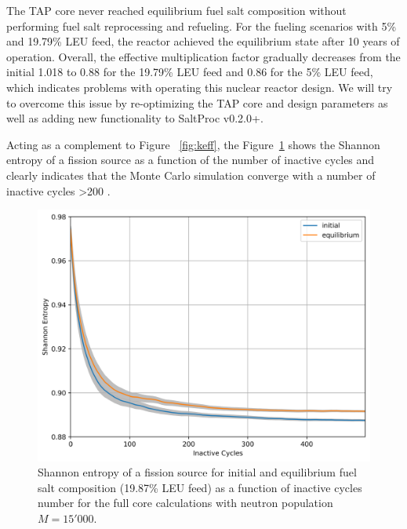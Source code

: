 \documentclass[12pt]{article} %
\begin{document}
The \gls{TAP} core never reached equilibrium fuel salt composition without 
performing fuel salt reprocessing and refueling. For the fueling scenarios 
with 5\% and 19.79\% \gls{LEU} feed, the reactor achieved the equilibrium 
state after 10 years of operation. Overall, the effective multiplication 
factor gradually decreases from the initial 1.018 to 0.88 for the 19.79\% 
\gls{LEU} feed and 0.86 for the 5\% \gls{LEU} feed, which indicates 
problems with operating this nuclear reactor design. We will try to overcome 
this issue by re-optimizing the \gls{TAP} core and design parameters as well 
as adding new functionality to SaltProc v0.2.0+.

Acting as a complement to Figure ~\ref{fig:keff}, the Figure~\ref{fig:shannon} 
shows the Shannon entropy of a fission source as a function of the number of 
inactive cycles and clearly indicates that the Monte Carlo simulation 
converge with a number of inactive cycles >200 
\cite{brown_k-effective_2011-1}. 
\begin{figure}[htp!] %
  \centering
		  \includegraphics[width=\textwidth]{h_src.png}
	 \vspace{-0.35in}
  \caption{Shannon entropy of a fission source for initial and equilibrium 
  fuel salt composition (19.87\% \gls{LEU} feed) as a function of inactive 
  cycles number for the full core calculations with neutron population $M=15'000$.}
  \label{fig:shannon}
\end{figure}
\end{document}

